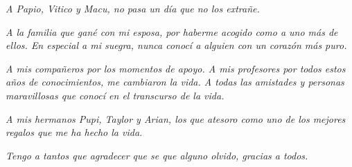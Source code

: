 \begin{acknowledgements}
\begin{flushleft}
{		\emph{	A Papio, Vitico y Macu, no pasa un día que no los extrañe. }
			\newline
		
		\emph{	A la familia que gané con mi esposa, por haberme acogido como a uno más de ellos. En especial a mi suegra, nunca conocí a alguien con un corazón más puro. }
			\newline
			
		\emph{	A mis compañeros por los momentos de apoyo. A mis profesores por todos estos años de conocimientos, me cambiaron la vida. A todas las amistades y personas maravillosas que conocí en el transcurso de la vida.}
			\newline
			
		\emph{	A mis hermanos Pupi, Taylor y Arian, los que atesoro como uno de los mejores regalos que me ha hecho la vida.}
			\newline
			
		\emph{	Tengo a tantos que agradecer que se que alguno olvido, gracias a todos.}}

	\end{flushleft}

   
   
   
  
 
  
   
   
  
   
\end{acknowledgements}